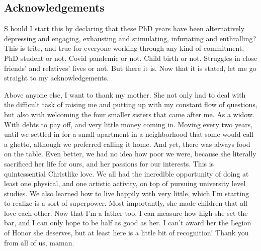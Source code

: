 
{}

\vspace*{-1.6cm}
\begin{flushright}
\section*{\fontsize{20pt}{20pt}\selectfont\textnormal{Acknowledgements}}
\end{flushright}
\vspace{-0.2cm}


\chead[\fancyplain{}{}]
      {\fancyplain{}{}}
\lfoot[\fancyplain{}{}]
      {\fancyplain{}{}}
\cfoot[\fancyplain{}{\thepage}]
      {\fancyplain{}{\thepage}}
\rfoot[\fancyplain{}{}]%
     {\fancyplain{}{\scriptsize}}


\lettrine[lines=1]{S}{ } hould I start this by declaring that these PhD years have been alternatively depressing and engaging, exhausting and stimulating, infuriating and enthralling? This is trite, and true for everyone working through any kind of commitment, PhD student or not. Covid pandemic or not. Child birth or not. Struggles in close friends' and relatives' lives or not. But there it is. Now that it is stated, let me go straight to my acknowledgements.

Above anyone else, I want to thank my mother. She not only had to deal with the difficult task of raising me and putting up with my constant flow of questions, but also with welcoming the four smaller sisters that came after me. As a widow. With debts to pay off, and very little money coming in. Moving every two years, until we settled in for a small apartment in a neighborhood that some would call a ghetto, although we preferred calling it home. And yet, there was always food on the table. Even better, we had no idea how poor we were, because she literally sacrificed her life for ours, and her passions for our interests. This is quintessential Christlike love. We all had the incredible opportunity of doing at least one physical, and one artistic activity, on top of pursuing university level studies. We also learned how to live happily with very little, which I'm starting to realize is a sort of superpower. Most importantly, she made children that all love each other. Now that I'm a father too, I can measure how high she set the bar, and I can only hope to be half as good as her. I can't award her the Legion of Honor she deserves, but at least here is a little bit of recognition! Thank you from all of us, maman.

